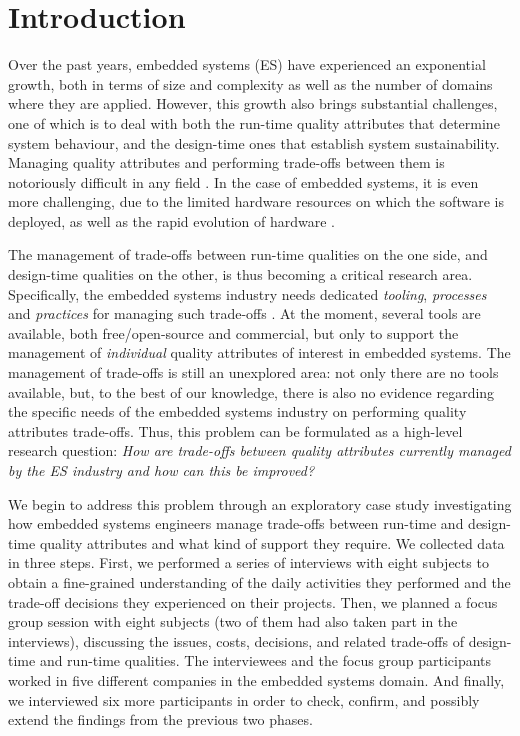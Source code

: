 \section{Introduction}\label{c7:sec:intro}
Over the past years, embedded systems (ES) have experienced an exponential growth, both in terms of size and complexity as well as the number of domains where they are applied.
However, this growth also brings substantial challenges, one of which is to deal with both the run-time quality attributes that determine system behaviour, and the design-time ones that establish system sustainability.
Managing quality attributes and performing trade-offs between them is notoriously difficult in any field \cite{Bass2012}.
In the case of embedded systems, it is even more challenging, due to the limited hardware resources on which the software is deployed, as well as the rapid evolution of hardware \cite{Mallick2009}. 

The management of trade-offs between run-time qualities on the one side, and design-time qualities on the other, is thus becoming a critical research area. Specifically, the embedded systems industry needs dedicated \textit{tooling}, \textit{processes} and \textit{practices} for managing such trade-offs \cite{Ampatzoglou2016}.
At the moment, several tools are available, both free/open-source and commercial, but only to support the management of \textit{individual} quality attributes of interest in embedded systems.
The management of trade-offs is still an unexplored area: not only there are no tools available, but, to the best of our knowledge, there is also no evidence regarding the specific needs of the embedded systems industry on performing quality attributes trade-offs. 
Thus, this problem can be formulated as a high-level research question: \textit{How are trade-offs between quality attributes currently managed by the ES industry and how can this be improved?} 

We begin to address this problem through an exploratory case study  investigating how  embedded systems engineers manage trade-offs between run-time and design-time quality attributes and what kind of support they require.
We collected data in three steps. 
First, we performed a series of interviews with eight subjects to obtain a fine-grained understanding of the daily activities they performed and the trade-off decisions they experienced on their projects.
Then, we planned a focus group session with eight subjects (two of them had also taken part in the interviews), discussing the issues, costs, decisions, and related trade-offs of design-time and run-time qualities. The interviewees and the focus group participants worked in five different companies in the embedded systems domain. 
And finally, we interviewed six more participants in order to check, confirm, and possibly extend the findings from the previous two phases.

